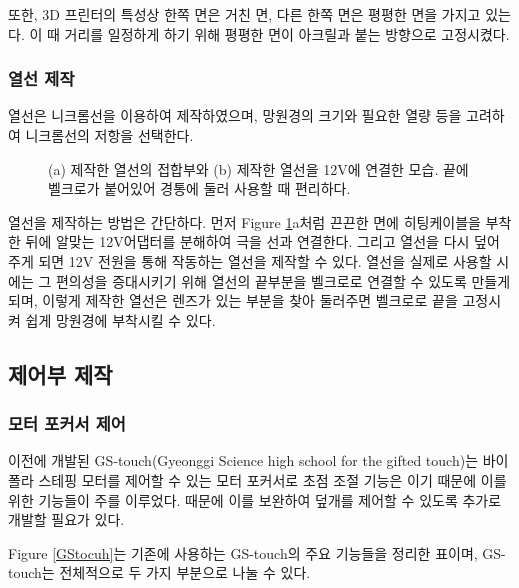 또한, 3D 프린터의 특성상 한쪽 면은 거친 면, 다른 한쪽 면은 평평한 면을 가지고 있는다. 이 때 거리를 일정하게 하기 위해 평평한 면이 아크릴과 붙는 방향으로 고정시켰다.

\subsubsection{열선 제작}
열선은  니크롬선을 이용하여 제작하였으며, 망원경의 크기와 필요한 열량 등을 고려하여 니크롬선의 저항을 선택한다.

\begin{figure}[h]
	\begin{center}
	\end{center}
	\caption{(a) 제작한 열선의 접합부와 (b) 제작한 열선을 12V에 연결한 모습. 끝에 벨크로가 붙어있어 경통에 둘러 사용할 때 편리하다.}
	\label{thermic}
\end{figure}

열선을 제작하는 방법은 간단하다. 먼저 \textrm{Figure} \ref{thermic}a처럼 끈끈한 면에 히팅케이블을 부착한 뒤에 알맞는 12V어댑터를 분해하여 극을 선과 연결한다. 그리고 열선을 다시 덮어주게 되면 12V 전원을 통해 작동하는 열선을 제작할 수 있다. 열선을 실제로 사용할 시에는 그 편의성을 증대시키기 위해 열선의 끝부분을 벨크로로 연결할 수 있도록 만들게 되며, 이렇게 제작한 열선은 렌즈가 있는 부분을 찾아 둘러주면 벨크로로 끝을 고정시켜 쉽게 망원경에 부착시킬 수 있다.


\subsection{제어부 제작}

\subsubsection{모터 포커서 제어}

이전에 개발된 GS-touch(Gyeonggi Science high school for the gifted touch)는 바이폴라 스테핑 모터를 제어할 수 있는 모터 포커서로 초점 조절 기능은 이기 때문에 이를 위한 기능들이 주를 이루었다. 때문에 이를 보완하여 덮개를 제어할 수 있도록 추가로 개발할 필요가 있다.


\textrm{Figure} \ref{GStocuh}는 기존에 사용하는 GS-touch의 주요 기능들을 정리한 표이며, GS-touch는 전체적으로 두 가지 부분으로 나눌 수 있다.

